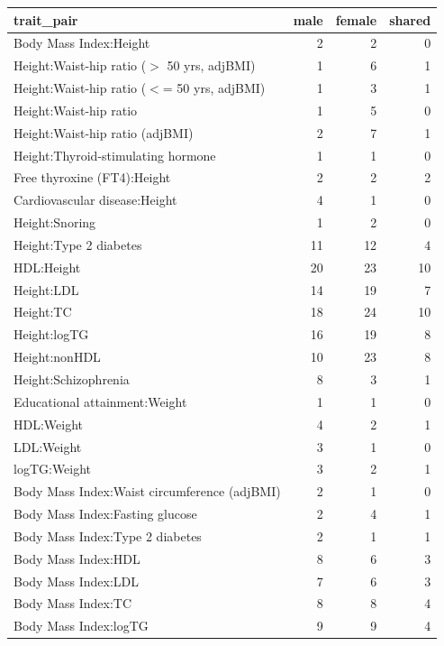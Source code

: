 \begin{table}[ht]
\centering
\begin{tabular}{lrrr}
  \hline
trait\_pair & male & female & shared \\ 
  \hline
Body Mass Index:Height &   2 &   2 &   0 \\ 
  Height:Waist-hip ratio ($>$ 50 yrs, adjBMI) &   1 &   6 &   1 \\ 
  Height:Waist-hip ratio ($<$= 50 yrs, adjBMI) &   1 &   3 &   1 \\ 
  Height:Waist-hip ratio &   1 &   5 &   0 \\ 
  Height:Waist-hip ratio (adjBMI) &   2 &   7 &   1 \\ 
  Height:Thyroid-stimulating hormone &   1 &   1 &   0 \\ 
  Free thyroxine (FT4):Height &   2 &   2 &   2 \\ 
  Cardiovascular disease:Height &   4 &   1 &   0 \\ 
  Height:Snoring &   1 &   2 &   0 \\ 
  Height:Type 2 diabetes &  11 &  12 &   4 \\ 
  HDL:Height &  20 &  23 &  10 \\ 
  Height:LDL &  14 &  19 &   7 \\ 
  Height:TC &  18 &  24 &  10 \\ 
  Height:logTG &  16 &  19 &   8 \\ 
  Height:nonHDL &  10 &  23 &   8 \\ 
  Height:Schizophrenia &   8 &   3 &   1 \\ 
  Educational attainment:Weight &   1 &   1 &   0 \\ 
  HDL:Weight &   4 &   2 &   1 \\ 
  LDL:Weight &   3 &   1 &   0 \\ 
  logTG:Weight &   3 &   2 &   1 \\ 
  Body Mass Index:Waist circumference (adjBMI) &   2 &   1 &   0 \\ 
  Body Mass Index:Fasting glucose &   2 &   4 &   1 \\ 
  Body Mass Index:Type 2 diabetes &   2 &   1 &   1 \\ 
  Body Mass Index:HDL &   8 &   6 &   3 \\ 
  Body Mass Index:LDL &   7 &   6 &   3 \\ 
  Body Mass Index:TC &   8 &   8 &   4 \\ 
  Body Mass Index:logTG &   9 &   9 &   4 \\ 

\end{tabular}
\end{table}
